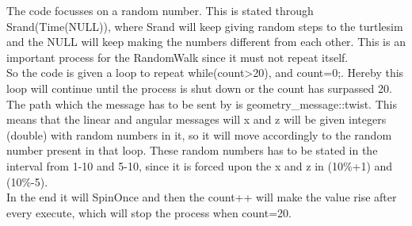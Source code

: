 The code focusses on a random number. This is stated through Srand(Time(NULL)), where Srand will keep giving random steps to the turtlesim and the NULL will keep making the numbers different from each other. This is an important process for the RandomWalk since it must not repeat itself.\\
So the code is given a loop to repeat while(count>20), and count=0;. Hereby this loop will continue until the process is shut down or the count has surpassed 20.\\
The path which the message has to be sent by is geometry\_message::twist. This means that the linear and angular messages will x and z will be given integers (double) with random numbers in it, so it will move accordingly to the random number present in that loop. These random numbers has to be stated in the interval from 1-10 and 5-10, since it is forced upon the x and z in (10\%+1) and (10\%-5).\\
In the end it will SpinOnce and then the count++ will make the value rise after every execute, which will stop the process when count=20.\\
